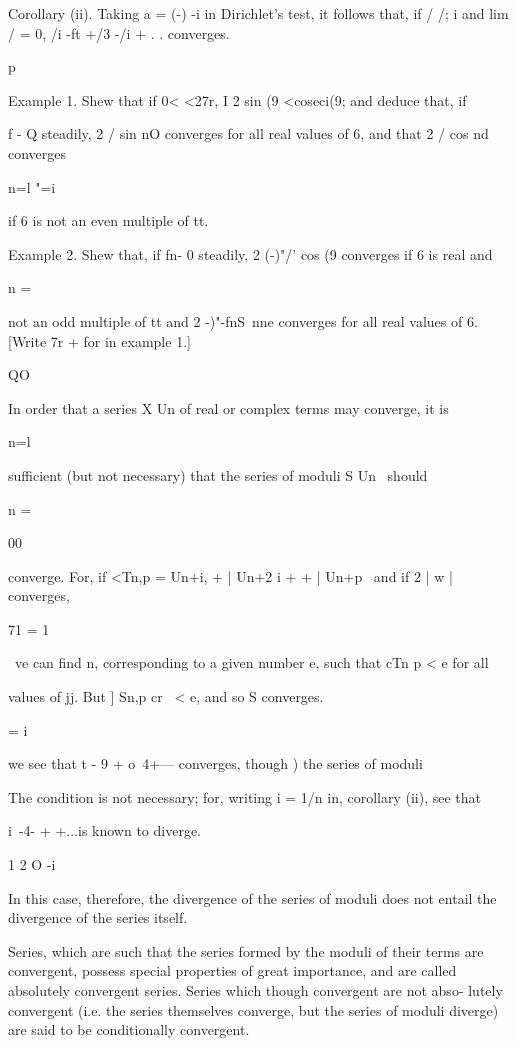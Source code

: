 Corollary (ii). Taking a = (-) -i in Dirichlet's test, it follows
that, if / /; i and lim / = 0, /i -ft +/3 -/i + . .  converges.

p

Example 1. Shew that if 0< <27r, I 2 sin (9 <coseci(9; and deduce
that, if

f - Q steadily, 2 / sin nO converges for all real values of 6, and
that 2 / cos nd converges

n=l "=i

if 6 is not an even multiple of tt.

Example 2. Shew that, if fn- 0 steadily, 2 (-)"/' cos (9 converges if
6 is real and

n = \

not an odd multiple of tt and 2 -)"-fnS\ nne converges for all real
values of 6. [Write 7r + for in example 1.]


QO

In order that a series X Un of real or complex terms may converge, it
is

n=l

sufficient (but not necessary) that the series of moduli S Un \ should

n = \

00

converge. For, if <Tn,p = Un+i, + | Un+2 i +    + | Un+p \ and if
2 | w | converges,

71 = 1

\ ve can find n, corresponding to a given number e, such that cTn p <
e for all

values of jj. But ] Sn,p cr \ < e, and so S converges.

  = i

we see that t - 9 + o~4+--- converges, though ) the series of
moduli

The condition is not necessary; for, writing i = 1/n in,
corollary (ii), see that

i\ -4- + +...is known to diverge.

1 2 O -i

In this case, therefore, the divergence of the series of moduli does
not entail the divergence of the series itself.

Series, which are such that the series formed by the moduli of their
terms are convergent, possess special properties of great importance,
and are called absolutely convergent series. Series which though
convergent are not abso- lutely convergent (i.e. the series themselves
converge, but the series of moduli diverge) are said to be
conditionally convergent.

